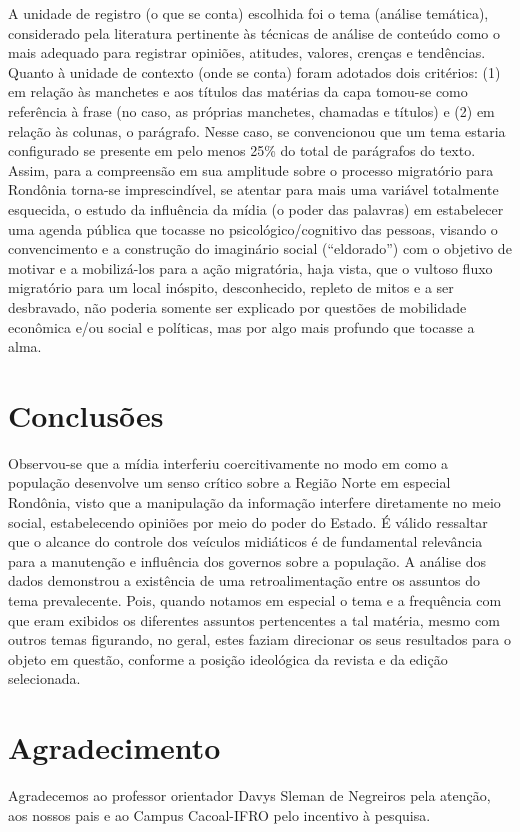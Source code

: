 \documentclass[article,12pt,onesidea,4paper,english,brazil]{abntex2}
\begin{document}
A unidade de registro (o que se conta) escolhida foi o tema (análise temática), considerado pela literatura pertinente às técnicas de análise de conteúdo como o mais adequado para registrar opiniões, atitudes, valores, crenças e tendências.
Quanto à unidade de contexto (onde se conta) foram adotados dois critérios: (1) em relação às manchetes e aos títulos das matérias da capa tomou-se como referência à frase (no caso, as próprias manchetes, chamadas e títulos) e (2) em relação às colunas, o parágrafo. Nesse caso, se convencionou que um tema estaria configurado se presente em pelo menos 25\% do total de parágrafos do texto. Assim, para a compreensão em sua amplitude sobre o processo migratório para Rondônia torna-se imprescindível, se atentar para mais uma variável totalmente esquecida, o estudo da influência da mídia (o poder das palavras) em estabelecer uma agenda pública que tocasse no psicológico/cognitivo das pessoas, visando o convencimento e a construção do imaginário social (“eldorado”) com o objetivo de motivar e a mobilizá-los para a ação migratória, haja vista, que o vultoso fluxo migratório para um local inóspito, desconhecido, repleto de mitos e a ser desbravado, não poderia somente ser explicado por questões de mobilidade econômica e/ou social e  políticas, mas por algo mais profundo que tocasse a alma.

	
	\section*{Conclusões}
	
Observou-se que a mídia interferiu coercitivamente no modo em como a população desenvolve um senso crítico sobre a Região Norte em especial Rondônia, visto que a manipulação da informação interfere diretamente no meio social, estabelecendo opiniões por meio do poder do Estado. É válido ressaltar que o alcance do controle dos veículos midiáticos é de fundamental relevância para a manutenção e influência dos governos sobre a população. A análise dos dados demonstrou a existência de uma retroalimentação entre os assuntos do tema prevalecente. Pois, quando notamos em especial o tema e a frequência com que eram exibidos os diferentes assuntos pertencentes a tal matéria, mesmo com outros temas figurando, no geral, estes faziam direcionar os seus resultados para o objeto em questão, conforme a posição ideológica da revista e da edição selecionada.

	\section*{Agradecimento}
	Agradecemos ao professor orientador Davys Sleman de Negreiros pela atenção, aos nossos pais e ao Campus Cacoal-IFRO pelo incentivo à pesquisa.
	
\end{document}
